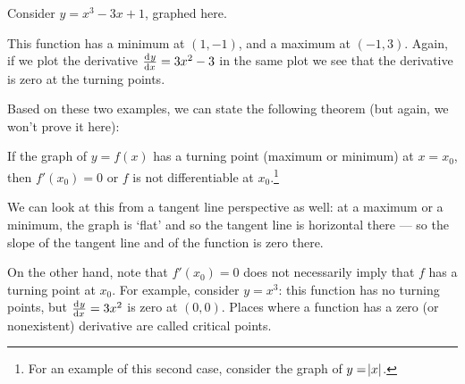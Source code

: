 \clearpage
\begin{ex}
  Consider $ y = x^3 - 3x + 1 $, graphed here.
  \begin{center}
  \end{center}
  This function has a minimum at $ (1, -1) $, and a maximum at $ (-1, 3) $. Again, if we plot the derivative $ \od{y}{x} = 3x^2 - 3 $
  in the same plot we see that the derivative is zero at the turning points.
  \begin{center}
  \end{center}
\end{ex}

Based on these two examples, we can state the following theorem (but again, we won't prove it here):
\begin{thm}
  If the graph of $ y = f(x) $ has a turning point (maximum or minimum) at $ x = x_0 $, then $ f'(x_0) = 0 $ or $ f $ is
  not differentiable at $ x_0 $.\footnote{For an example of this second case, consider the graph of $ y = \abs{x} $.}
\end{thm}

We can look at this from a tangent line perspective as well: at a maximum or a minimum, the graph is `flat' and
so the tangent line is horizontal there --- so the slope of the tangent line and of the function is zero there.

On the other hand, note that $ f'(x_0) =  0 $ does not necessarily imply that $ f $ has a turning point at $ x_0 $.
For example, consider $ y = x^3 $: this function has no turning points, but $ \od{y}{x} = 3x^2 $ is zero at $ (0,0) $.
Places where a function has a zero (or nonexistent) derivative are called critical points.

